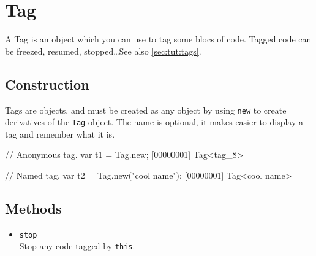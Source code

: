 \section{Tag}

A Tag is an object which you can use to tag some blocs of code.
Tagged code can be freezed, resumed, stopped\ldots See also
\autoref{sec:tut:tags}.

\subsection{Construction}
\label{stdlib:tag:ctor}

Tags are objects, and must be created as any object by using
\lstinline{new} to create derivatives of the \lstinline{Tag} object.
The name is optional, it makes easier to display a tag and remember
what it is.

\begin{urbiscript}
// Anonymous tag.
var t1 = Tag.new;
[00000001] Tag<tag_8>

// Named tag.
var t2 = Tag.new("cool name");
[00000001] Tag<cool name>
\end{urbiscript}


\subsection{Methods}
\begin{itemize}
\item \lstinline|stop|~\\
  Stop any code tagged by \lstinline|this|.
\end{itemize}

